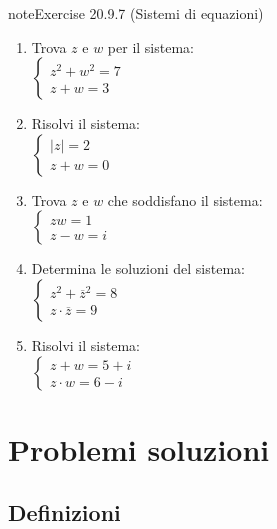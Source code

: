 \documentclass[letterpaper,10pt,italian]{jupyterBook}
\begin{document}
\begin{sphinxadmonition}{note}{Exercise 20.9.7 (Sistemi di equazioni)}
\begin{enumerate}
\item {} 
\sphinxAtStartPar
Trova \(z\) e \(w\) per il sistema:\\
\(\begin{cases} 
z^2 + w^2 = 7 \\
z + w = 3 
\end{cases}\)

\item {} 
\sphinxAtStartPar
Risolvi il sistema:\\
\(\begin{cases} 
|z| = 2 \\
z + w = 0 
\end{cases}\)

\item {} 
\sphinxAtStartPar
Trova \(z\) e \(w\) che soddisfano il sistema:\\
\(\begin{cases} 
z w = 1 \\
z - w = i 
\end{cases}\)

\item {} 
\sphinxAtStartPar
Determina le soluzioni del sistema:\\
\(\begin{cases} 
z^2 + \overline{z}^2 = 8 \\
z \cdot \overline{z} = 9 
\end{cases}\)

\item {} 
\sphinxAtStartPar
Risolvi il sistema:\\
\(\begin{cases} 
z + w = 5 + i \\
z \cdot w = 6 - i 
\end{cases}\)

\end{enumerate}
\end{sphinxadmonition}

\sphinxstepscope


\section{Problemi \sphinxhyphen{} soluzioni}
\label{\detokenize{ch/algebra/complex-algebra-sol:problemi-soluzioni}}\label{\detokenize{ch/algebra/complex-algebra-sol:math-hs-algebra-complex-sol}}\label{\detokenize{ch/algebra/complex-algebra-sol::doc}}

\subsection{Definizioni}
\label{\detokenize{ch/algebra/complex-algebra-sol:definizioni}}\label{\detokenize{ch/algebra/complex-algebra-sol:math-hs-algebra-complex-sol-def}}
\end{document}
